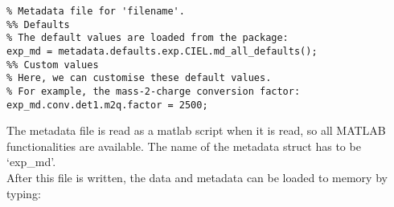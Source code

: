 \begin{lstlisting}
% Metadata file for 'filename'.
%% Defaults
% The default values are loaded from the package:
exp_md = metadata.defaults.exp.CIEL.md_all_defaults();
%% Custom values
% Here, we can customise these default values.
% For example, the mass-2-charge conversion factor:
exp_md.conv.det1.m2q.factor = 2500;
\end{lstlisting}

The metadata file is read as a matlab script when it is read, so all MATLAB functionalities are available. The name of the metadata struct has to be `exp\_md'. \\
After this file is written, the data and metadata can be loaded to memory by typing:


\begin{lstlisting}

\end{lstlisting}

